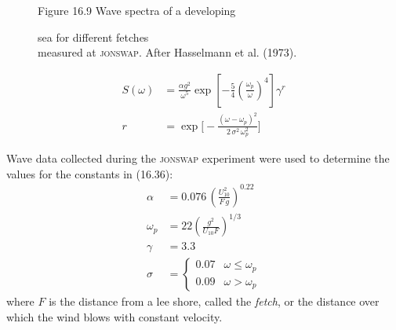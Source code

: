 \begin{figure}[t!]
\footnotesize
\centering
Figure 16.9 Wave spectra of a developing \rule{0mm}{3ex}sea for
different fetches\\measured at \textsc{jonswap}. After Hasselmann et al. (1973).

\label{fig:hasselmannspect}

\vspace{-3ex}
\end{figure}

\begin{subequations}
\begin{align}
S(\omega) &= \frac{\alpha g^{2}}{\omega ^{5}} \exp \left[ - \frac{5}{4}
\left(
\frac{\omega _{p}}{\omega } \right) ^{4} \right] \gamma ^{r} \\
r &= \exp \biggl[ - \frac{\left(\omega - \omega _{p}\right)^{2}}{2\, \sigma ^{2}
\,\omega _{p}^{2}}
\biggr]
\end{align}
\end{subequations}

Wave data collected during the \textsc{jonswap} experiment were used
to determine the values for the constants in (16.36):
\begin{subequations}
\begin{align}
\alpha &= 0.076 \, \left( \frac{U_{10}^{2}}{F \, g} \right)^{0.22} \\
\omega_p &= 22 \left(\frac{g^2}{U_{10}F}\right)^{1/3} \\
\gamma &= 3.3 \\
   \sigma &= \left\{ \begin{array}{ll}
                    0.07 & \omega \leq \omega _{p} \\
                    0.09 & \omega > \omega _{p}
                    \end{array}
            \right.
\end{align}
\end{subequations}
where $F$ is the distance from a lee shore, called the
\textit{fetch}, or the
distance over which the wind blows with constant velocity.

